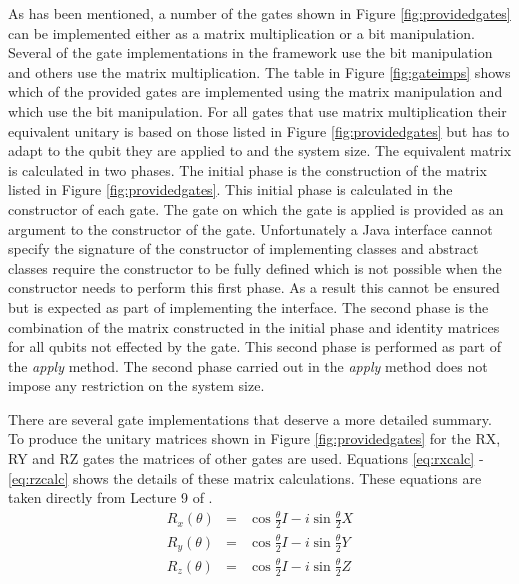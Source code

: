 As has been mentioned, a number of the gates shown in Figure \ref{fig:providedgates} can be implemented either as a matrix multiplication or a bit manipulation.
Several of the gate implementations in the framework use the bit manipulation and others use the matrix multiplication.
The table in Figure \ref{fig:gateimps} shows which of the provided gates are implemented using the matrix manipulation and which use the bit manipulation.
For all gates that use matrix multiplication their equivalent unitary is based on those listed in Figure \ref{fig:providedgates} but has to adapt to the qubit they are applied to and the system size.
The equivalent matrix is calculated in two phases.
The initial phase is the construction of the matrix listed in Figure \ref{fig:providedgates}.
This initial phase is calculated in the constructor of each gate.
The gate on which the gate is applied is provided as an argument to the constructor of the gate.
Unfortunately a Java interface cannot specify the signature of the constructor of implementing classes and abstract classes require the constructor to be fully defined which is not possible when the constructor needs to perform this first phase.
As a result this cannot be ensured but is expected as part of implementing the interface.
The second phase is the combination of the matrix constructed in the initial phase and identity matrices for all qubits not effected by the gate.
This second phase is performed as part of the \emph{apply} method.
The second phase carried out in the \emph{apply} method does not impose any restriction on the system size.

There are several gate implementations that deserve a more detailed summary.
To produce the unitary matrices shown in Figure \ref{fig:providedgates} for the RX, RY and RZ gates the matrices of other gates are used.
Equations \ref{eq:rxcalc} - \ref{eq:rzcalc} shows the details of these matrix calculations.
These equations are taken directly from Lecture 9 of \cite{QIPLect}.
\begin{eqnarray}
\label{eq:rxcalc}
 R_x(\theta)&=&\cos{\frac{\theta}{2}}I-i\sin{\frac{\theta}{2}}X \\
\label{eq:rycalc}
 R_y(\theta)&=&\cos{\frac{\theta}{2}}I-i\sin{\frac{\theta}{2}}Y \\
\label{eq:rzcalc}
 R_z(\theta)&=&\cos{\frac{\theta}{2}}I-i\sin{\frac{\theta}{2}}Z 
\end{eqnarray}

